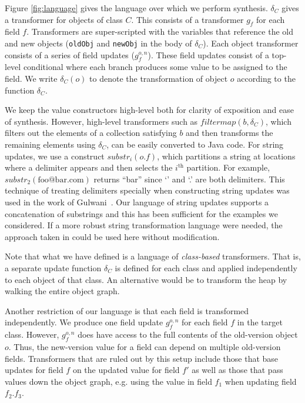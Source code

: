Figure \ref{fig:language} gives the language over which we perform synthesis.  $\delta_C$ gives a transformer for objects of class $C$.  This consists of a transformer $g_f$ for each field $f$.  Transformers are super-scripted with the variables that reference the old and new objects (\texttt{oldObj} and \texttt{newObj} in the body of $\delta_C$).  Each object transformer consists of a series of field updates ($g_f^{o,n}$).  These field updates consist of a top-level conditional where each branch produces some value to be assigned to the field.  We write $\delta_C(o)$ to denote the transformation of object $o$ according to the function $\delta_C$.

We keep the value constructors high-level both for clarity of exposition and ease of synthesis.  However, high-level transformers such as $\textit{filtermap}(b,\delta_C)$, which filters out the elements of a collection satisfying $b$ and then transforms the remaining elements using $\delta_C$, can be easily converted to Java code.  For string updates, we use a construct $\textit{substr}_i(o.f)$, which partitions a string at locations where a delimiter appears and then selects the $i^\text{th}$ partition.  For example, $\textit{substr}_2(\text{foo@bar.com})$ returns ``bar'' since `\@' and `.' are both delimiters.  This technique of treating delimiters specially when constructing string updates was used in the work of Gulwani~\cite{gulwani-strings}.  Our language of string updates supports a concatenation of substrings and this has been sufficient for the examples we considered.  If a more robust string transformation language were needed, the approach taken in \cite{gulwani-strings} could be used here without modification.

Note that what we have defined is a language of \emph{class-based} transformers.  That is, a separate update function $\delta_C$ is defined for each class and applied independently to each object of that class.  An alternative would be to transform the heap by walking the entire object graph.  

Another restriction of our language is that each field is transformed independently.  We produce one field update $g_f^{o,n}$ for each field $f$ in the target class.  However, $g_f^{o,n}$ does have access to the full contents of the old-version object $o$.  Thus, the new-version value for a field can depend on multiple old-version fields.  Transformers that are ruled out by this setup include those that base updates for field $f$ on the updated value for field $f'$ as well as those that pass values down the object graph, e.g. using the value in field $f_1$ when updating field $f_2.f_3$.

